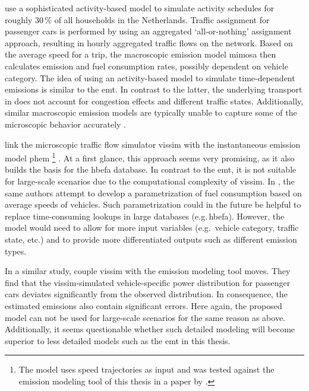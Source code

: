 {\citet{BeckxEtAl_EnvPlannB_2009} use a sophisticated 
activity-based model to simulate activity schedules for roughly 30\,\% of all 
households in the Netherlands. Traffic assignment for passenger cars is 
performed by using an aggregated `all-or-nothing' assignment approach, 
resulting in hourly aggregated traffic flows on the network. Based on the 
average speed for a trip, the macroscopic emission model \acrshort{mimosa} then 
calculates emission and fuel consumption rates, possibly dependent on vehicle 
category. The idea of using an activity-based model to simulate 
time-dependent emissions is similar to the \gls{emt}. In contrast to the 
latter, the underlying transport in \citet{BeckxEtAl_EnvPlannB_2009} 
does not account for congestion effects and different traffic states. 
Additionally, similar macroscopic emission models are typically unable to 
capture some of the microscopic behavior accurately 
\citep[see, e.g.,][]{AhnRakha_TransResD_2008}. 

\citet{HirschmannEtAl_ITSC_2010} link the 
microscopic traffic flow simulator \acrshort{vissim} with the instantaneous 
emission model \acrshort{phem}%
%
\footnote{
%
The model uses speed trajectories as input and was tested against the emission 
modeling tool of this thesis in a paper by 
\citet{HuelsmannEtAl_LAS_2011}.
%
}%
. At a first glance, this approach seems very promising, as it also builds the 
basis for the \gls{hbefa} database. In contrast to the \gls{emt}, it is not 
suitable for large-scale scenarios due to the computational complexity of 
\acrshort{vissim}.
%
In \citet{Kraschl-HirschmannEtAl_FISTS_2011}, the same authors attempt to 
develop a parametrization of fuel consumption based on average speeds of 
vehicles. Such parametrization could in the future be helpful to replace 
time-consuming lookups in large databases (e.g.\,\gls{hbefa}). However, the 
model would need to allow for more input variables (e.g.\ vehicle category, 
traffic state, etc.) and to provide more differentiated outputs such as 
different emission types.

In a similar study, \citet{SongEtAl_TRR_2012} couple 
\acrshort{vissim} with the emission modeling tool \acrshort{moves}. They find 
that the \acrshort{vissim}-simulated vehicle-specific power distribution for 
passenger cars deviates significantly from the observed distribution. In 
consequence, the estimated emissions also contain significant errors. Here 
again, the proposed model can not be used for large-scale scenarios for the 
same reason as above. Additionally, it seems questionable whether such detailed 
modeling will become superior to less detailed models such as the \gls{emt} in 
this thesis.

}
